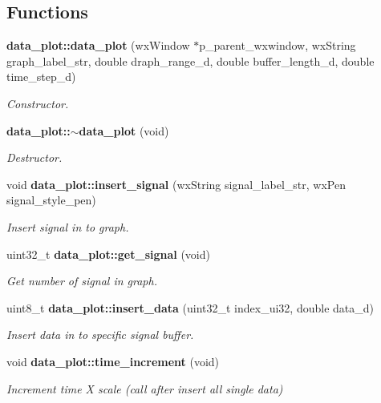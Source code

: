 \subsection*{Functions}
\begin{DoxyCompactItemize}
\item 
\textbf{ data\+\_\+plot\+::data\+\_\+plot} (wx\+Window $\ast$p\+\_\+parent\+\_\+wxwindow, wx\+String graph\+\_\+label\+\_\+str, double draph\+\_\+range\+\_\+d, double buffer\+\_\+length\+\_\+d, double time\+\_\+step\+\_\+d)
\begin{DoxyCompactList}\small\item\em Constructor. \end{DoxyCompactList}\item 
\textbf{ data\+\_\+plot\+::$\sim$data\+\_\+plot} (void)
\begin{DoxyCompactList}\small\item\em Destructor. \end{DoxyCompactList}\item 
void \textbf{ data\+\_\+plot\+::insert\+\_\+signal} (wx\+String signal\+\_\+label\+\_\+str, wx\+Pen signal\+\_\+style\+\_\+pen)
\begin{DoxyCompactList}\small\item\em Insert signal in to graph. \end{DoxyCompactList}\item 
uint32\+\_\+t \textbf{ data\+\_\+plot\+::get\+\_\+signal} (void)
\begin{DoxyCompactList}\small\item\em Get number of signal in graph. \end{DoxyCompactList}\item 
uint8\+\_\+t \textbf{ data\+\_\+plot\+::insert\+\_\+data} (uint32\+\_\+t index\+\_\+ui32, double data\+\_\+d)
\begin{DoxyCompactList}\small\item\em Insert data in to specific signal buffer. \end{DoxyCompactList}\item 
void \textbf{ data\+\_\+plot\+::time\+\_\+increment} (void)
\begin{DoxyCompactList}\small\item\em Increment time X scale (call after insert all single data) \end{DoxyCompactList}\end{DoxyCompactItemize}

